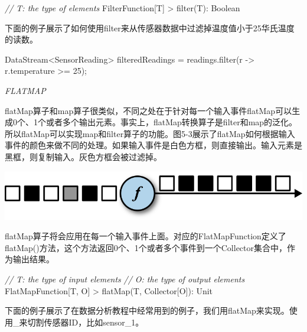 \documentclass[cn,11pt,chinese]{elegantbook}
\newenvironment{Shaded}{}{}
\newcommand{\BuiltInTok}[1]{#1}
\newcommand{\CommentTok}[1]{\textcolor[rgb]{0.38,0.63,0.69}{\textit{#1}}}
\newcommand{\DecValTok}[1]{\textcolor[rgb]{0.25,0.63,0.44}{#1}}
\newcommand{\FunctionTok}[1]{\textcolor[rgb]{0.02,0.16,0.49}{#1}}
\newcommand{\NormalTok}[1]{#1}
\begin{document}
\begin{Shaded}
\begin{Highlighting}[]
\CommentTok{// T: the type of elements}
\NormalTok{FilterFunction[T]}
\NormalTok{    \textgreater{} }\FunctionTok{filter}\NormalTok{(T): }\BuiltInTok{Boolean}
\end{Highlighting}
\end{Shaded}

下面的例子展示了如何使用filter来从传感器数据中过滤掉温度值小于25华氏温度的读数。

\begin{Shaded}
\begin{Highlighting}[]
\NormalTok{DataStream\textless{}SensorReading\textgreater{} filteredReadings = readings.}\FunctionTok{filter}\NormalTok{(r {-}\textgreater{} r.}\FunctionTok{temperature}\NormalTok{ \textgreater{}= }\DecValTok{25}\NormalTok{);}
\end{Highlighting}
\end{Shaded}

\emph{FLATMAP}

flatMap算子和map算子很类似，不同之处在于针对每一个输入事件flatMap可以生成0个、1个或者多个输出元素。事实上，flatMap转换算子是filter和map的泛化。所以flatMap可以实现map和filter算子的功能。图5-3展示了flatMap如何根据输入事件的颜色来做不同的处理。如果输入事件是白色方框，则直接输出。输入元素是黑框，则复制输入。灰色方框会被过滤掉。

\includegraphics{images/spaf_0503.png}

flatMap算子将会应用在每一个输入事件上面。对应的FlatMapFunction定义了flatMap()方法，这个方法返回0个、1个或者多个事件到一个Collector集合中，作为输出结果。

\begin{Shaded}
\begin{Highlighting}[]
\CommentTok{// T: the type of input elements}
\CommentTok{// O: the type of output elements}
\NormalTok{FlatMapFunction[T, O]}
\NormalTok{    \textgreater{} }\FunctionTok{flatMap}\NormalTok{(T, Collector[O]): Unit}
\end{Highlighting}
\end{Shaded}

下面的例子展示了在数据分析教程中经常用到的例子，我们用flatMap来实现。使用\_来切割传感器ID，比如sensor\_1。
\end{document}
